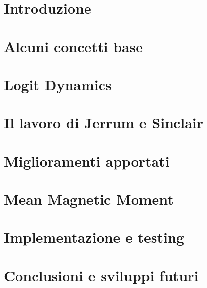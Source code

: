 \documentclass[11pt,oneside]{book}
\begin{document}
\vfill

{\hypersetup{linkcolor=black}
	\tableofcontents
}

\chapter{Introduzione}
\setcounter{page}{1} 		%



\chapter{Alcuni concetti base}


\chapter{Logit Dynamics}


\chapter{Il lavoro di Jerrum e Sinclair}


\chapter{Miglioramenti apportati}


\chapter{Mean Magnetic Moment}


\chapter{Implementazione e testing}


\chapter{Conclusioni e sviluppi futuri}






\end{document}
